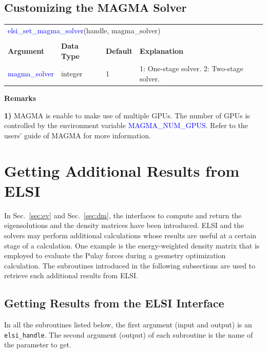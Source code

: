 \documentclass{report}
\newcommand{\tcb}[1]{\textcolor{blue}{#1}}
\begin{document}
\subsection{Customizing the MAGMA Solver}
\label{subsec:setter_magma}
\begin{tabular}[]{|p{30mm}|p{20mm}|p{15mm}|p{100mm}|}
\multicolumn{4}{l}{\tcb{elsi\_set\_magma\_solver}(handle, magma\_solver)}\\
\multicolumn{4}{l}{}\\
\hline
\multicolumn{1}{|l|}{\textbf{Argument}} & \multicolumn{1}{l|}{\textbf{Data Type}} & \multicolumn{1}{l|}{\textbf{Default}} & \multicolumn{1}{l|}{\textbf{Explanation}}\\
\hline
\tcb{magma\_solver} & integer & 1 & 1: One-stage solver. 2: Two-stage solver.\\
\hline
\end{tabular}

\textbf{Remarks}

\textbf{1)} MAGMA is enable to make use of multiple GPUs. The number of GPUs is controlled by the environment variable \tcb{MAGMA\_NUM\_GPUS}. Refer to the users' guide of MAGMA for more information.

\section{Getting Additional Results from ELSI}
\label{sec:getter}
In Sec.~\ref{sec:ev} and Sec.~\ref{sec:dm}, the interfaces to compute and return the eigensolutions and the density matrices have been introduced. ELSI and the solvers may perform additional calculations whose results are useful at a certain stage of a calculation. One example is the energy-weighted density matrix that is employed to evaluate the Pulay forces during a geometry optimization calculation. The subroutines introduced in the following subsections are used to retrieve such additional results from ELSI.

\subsection{Getting Results from the ELSI Interface}
\label{subsec:getter_elsi}
In all the subroutines listed below, the first argument (input and output) is an \texttt{elsi\_handle}. The second argument (output) of each subroutine is the name of the parameter to get.
\end{document}
